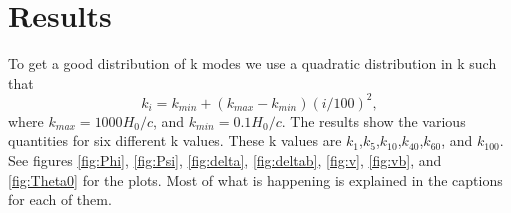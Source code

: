 \documentclass[a4paper]{report}
\begin{document}
\section{Results}\label{sec:results}
To get a good distribution of k modes we use a quadratic distribution in k such that
\begin{equation}
 k_i = k_{min} +(k_{max}-k_{min})(i/100)^2,
\end{equation}
where $k_{max} = 1000H_0/c$, and $k_{min} = 0.1H_0/c$.
The results show the various quantities for six different k values. These k values are $k_1$,$k_5$,$k_{10}$,$k_{40}$,$k_{60}$, and $k_{100}$. See figures \ref{fig:Phi}, \ref{fig:Psi}, \ref{fig:delta}, \ref{fig:deltab}, \ref{fig:v}, \ref{fig:vb}, and \ref{fig:Theta0} for the plots. Most of what is happening is explained in the captions for each of them.
\end{document}
